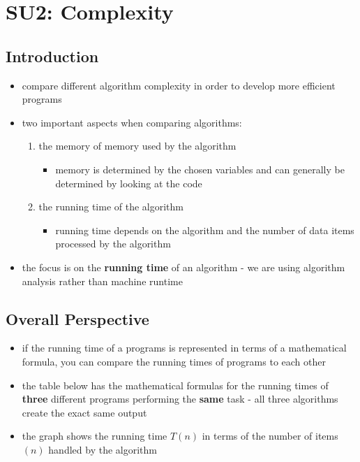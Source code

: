 
\renewcommand{\arraystretch}{1.75} %
\setlength{\tabcolsep}{8pt} %
\setlength{\arrayrulewidth}{0.75pt}


\section{SU2: Complexity}

\subsection{Introduction}

\begin{itemize}
    \item compare different algorithm complexity in order to develop more efficient programs
    \item two important aspects when comparing algorithms:
        \begin{enumerate}
            \item the \textcolor{Periwinkle}{memory} of memory used by the algorithm 
                \begin{itemize}
                    \item[] memory is determined by the chosen variables and can generally be determined by looking at the code
                \end{itemize}
            \item the \textcolor{Periwinkle}{running time} of the algorithm
                \begin{itemize}
                    \item[] running time depends on the algorithm and the number of data items processed by the algorithm 
                \end{itemize}
        \end{enumerate}
    \item the focus is on the \textbf{running time} of an algorithm - we are using algorithm analysis rather than machine runtime
\end{itemize}

\subsection{Overall Perspective}

\begin{itemize}
    \item if the running time of a programs is represented in terms of a mathematical formula, you can compare the running times of programs to each other 
    \item the table below has the mathematical formulas for the running times of \textbf{three} different programs performing the \textbf{same} task - all three algorithms create the exact same output 
    \item the graph shows the running time $T(n)$ in terms of the number of items$(n)$ handled by the algorithm
\end{itemize}

